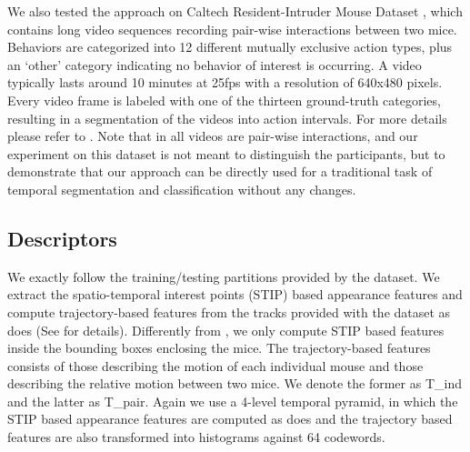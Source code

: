 \documentclass[10pt,twocolumn,letterpaper]{article}
\begin{document}
We also tested the approach on Caltech Resident-Intruder Mouse Dataset \cite{CRIM13}, which contains long video sequences recording pair-wise interactions between two mice. Behaviors are categorized into 12 different mutually exclusive action types, plus an `other' category indicating no behavior of interest is occurring. A video typically lasts around 10 minutes at 25fps with a resolution of 640x480 pixels. Every video frame is labeled with one of the thirteen ground-truth categories, resulting in a segmentation of the videos
into action intervals. For more details please refer to \cite{CRIM13}. Note that in all videos are pair-wise interactions, and our experiment on this dataset is not meant to distinguish the participants, but to demonstrate that our approach can be directly used for a traditional task of temporal segmentation and classification without any changes.

\subsection{Descriptors}

We exactly follow the training/testing partitions provided by the dataset. We extract the spatio-temporal interest points (STIP) based appearance features and compute trajectory-based features from the tracks provided with the dataset as \cite{CRIM13} does (See \cite{CRIM13} for details). Differently from \cite{CRIM13}, we only compute STIP based features inside the bounding boxes enclosing the mice. The trajectory-based features consists of those describing the motion of each individual mouse and those describing the relative motion between two mice. We denote the former as T\_ind and the latter as T\_pair. Again we use a 4-level temporal pyramid, in which the STIP based appearance features are computed as \cite{CRIM13} does and the trajectory based features are also transformed into histograms against 64 codewords. 
\end{document}
